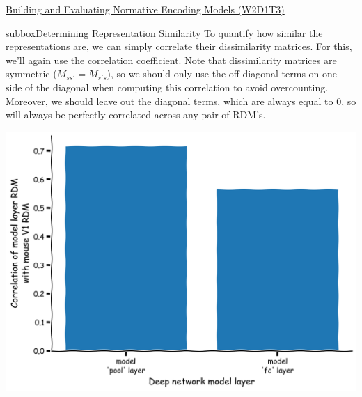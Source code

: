 \begin{textbox}{\href{https://compneuro.neuromatch.io/tutorials/W2D1_DeepLearning/student/W2D1_Tutorial3.html}{Building and Evaluating Normative Encoding Models (W2D1T3)} }
\begin{subbox}{subbox}{Determining Representation Similarity}
To quantify how similar the representations are, we can simply correlate their dissimilarity matrices. For this, we'll again use the correlation coefficient. Note that dissimilarity matrices are symmetric ($M_{ss'} = M_{s's}$), so we should only use the off-diagonal terms on one side of the diagonal when computing this correlation to avoid overcounting. Moreover, we should leave out the diagonal terms, which are always equal to 0, so will always be perfectly correlated across any pair of RDM's.

\centering
\includegraphics[scale=0.10]{Figures/DL/DLFigure5.png}

\end{subbox}
\end{textbox}

